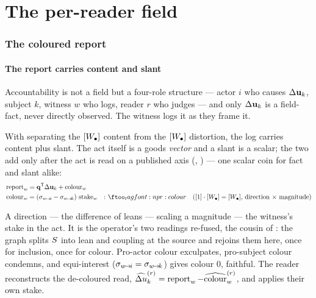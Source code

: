 \documentclass[../main]{subfiles}
\begin{document}
\clearpage
\part{The per-reader field}

\section{The coloured report}
\label{sec:coloured-report}

\subsection{The report carries content and slant}
\label{subsec:rep:content}
%
Accountability is not a field but a four-role structure --- actor $i$ who causes
$\Delta\mathbf{u}\sb{k}$, subject $k$, witness $w$ who logs, reader $r$ who judges --- and only
$\Delta\mathbf{u}\sb{k}$ is a field-fact, never directly observed. The witness logs it as they frame it.

\begin{definition}
  With  separating the $[W\sb{\bullet}]$ content from the $[W\sb{\bullet}]$ distortion, the
  log carries content plus slant. The act itself is a goods \emph{vector} and a slant is a
  scalar; the two add only after the act is read on a published axis
  (, ) --- one scalar coin for fact and slant alike:
  \PaperAlignSep{9pt}\begin{align}
    &\witnessreport{w} = \mathbf q\transpose\outcomechange{k} + \witnesscolour{w}
      \label{eq:pr:report}\\
    &\witnesscolour{w} = (\lean{w}{i}-\lean{w}{k})\,\witnessstake{w}
      &:& \eqtag{pr:colour}{$\dimratio\cdot\dimwelfare=\dimwelfare$, direction $\times$ magnitude}
  \end{align}
\end{definition}

A direction --- the difference of leans --- scaling a magnitude --- the witness's stake in
the act. It is the operator's two readings re-fused, the cousin of : the graph
splits $S$ into lean and coupling at the source and rejoins them here, once for inclusion,
once for colour. Pro-actor colour exculpates, pro-subject colour condemns, and equi-interest
($\sigma\sb{ w\!\to\!i }=\sigma\sb{ w\!\to\!k }$) gives colour $0$, faithful. The reader reconstructs the
de-coloured read,
$\widehat{\Delta u}\sb{k}\sp{(r)}=\operatorname{report}\sb{w}-\widehat{\operatorname{colour}}\sb{w}\sp{(r)}$, and applies their own stake.
\end{document}
